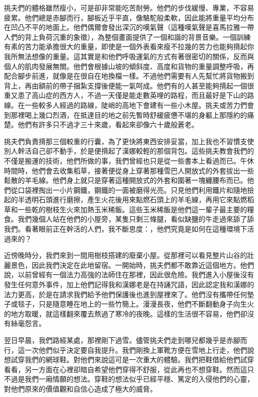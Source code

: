 挑夫們的體格雖然瘦小，可是卻非常能吃苦耐勞。他們的步伐緩慢、專業，不容易疲累。他們總是赤腳而行，腳板近乎平直，像駱駝般柔軟，因此能將重量平均分布在凹凸不平的地面上。他們偶爾會發出深沉的嘆氣聲（這種嘆氣聲是喜馬拉雅一帶人們的背上負荷沉重的象徵），為整個畫面提供了一個和諧的背景音樂。一個訓練有素的苦力能承擔很大的重量，即使是一個外表看來瘦不拉幾的苦力也能夠揹起你我所無法想像的重量。這其實是和他們呼吸運氣的方式有著很密切的關係，反而與個人的肌肉發展無關。他們會根據山坡的傾斜度、高度和貨物的重量調整呼吸，再配合腳步前進，就像是在很自在地換檔一樣。不過他們需要有人先幫忙將貨物搬到背上，再由額前的帶子捆紮支撐後便能一氣呵成。他們有的人甚至能夠揹起一個很重又患了高山症的西方人，不過一天僅是能走數英哩的路程，而且最好是下山的路線。在一些較多人經過的路線，陡峭的高地下會建有一些小木屋。挑夫或苦力們會到那裡喝上幾口烈酒，在抵達目的地之前先暫時舒緩疲憊不堪的身軀上那隱約的痛楚。他們有許多只不過才三十來歲，看起來卻像六十歲般蒼老。

挑夫們負責揹那三個較重的行囊，為了更快將東西安排妥當，加上我也不習慣支使別人幹活自己卻不動手，於是便揹起了漢娜較輕的那個背包。這些挑夫教會我們的不僅是搬運的技術，他們所做的事，我們曾經也只是從一些書本上看過而已。午休時間時，他們會去收集稻草，接著便從身上穿著那種雪巴人開放式的外套拔出一些鬆散的羊毛線。他們身上就只是穿著這種開放式的外套和圍著一塊纏腰布而已。他們從口袋裡掏出一小片鋼鐵，鋼鐵的一面被磨得光亮。只見他們利用鐵片和隨地撿起的半透明石頭進行磨擦，產生火花後用來點燃石頭上的羊毛線，再用它來點燃稻草和一些乾的樹枝生火來加熱玉米稀飯。這些玉米稀飯是他們這一輩子最主要的糧食。我們幾個人站在他們的小屋旁，某隻只剩三條腿，看似缺鹽的牛走過來舔了舔我們。看著眼前正在幹活的人們，我不斷思度：，他們究竟是如何在這種環境下活過來的？

近傍晚時分，我們來到一間用樹枝搭建的廢棄小屋。從那裡可以看見整片山谷的壯麗景色，因此我們決定在此地留宿。一開始時，挑夫們都不敢靠近這個地方。他們說，以前曾經有一個法力高強的法師住在那裡，因此很危險。我們進入小屋後沒有發生任何意外事件，加上他們記得我和漢娜老是在持誦咒語，因此認定我和漢娜的法力更高，於是在請求我們給予他們保護後也進到屋裡來了。他們沒有攜帶任何墊子或毯子，只是隨意睡在地上的一些竹簡上。漫漫長夜，他們不斷翻動身子向生火的地方取暖，就這樣翻來覆去熬過了寒冷的夜晚。這樣的生活很不容易，他們卻沒有絲毫怨言。

翌日早晨，我們路經某處，那裡剛下過雪。儘管挑夫們走到哪兒都幾乎是赤腳而行，這一次他們似乎決定要自我提升。我們剛換上軍靴方便在雪地上行走，他們說想試穿我們的網球鞋。對他們來說這可是一次重大的體驗。我們把鞋借給他們試穿看看，另一方面在心裡卻暗自希望他們穿得不舒服，從此再也不想穿鞋。然而這只不過是我們一廂情願的想法。穿鞋的想法似乎已經平穩、篤定的入侵他們的心靈，對他們原來的價值觀和自信心造成了極大的威脅。

